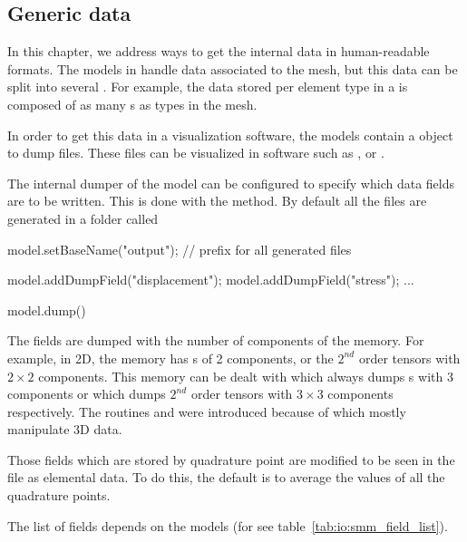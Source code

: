 \subsection{Generic data}
In this chapter, we address ways to get the internal data in human-readable formats.
The models in \akantu handle data associated to the
mesh, but this data can be split into several . For example, the
data stored per element type in a  is composed of as
many s as types in the mesh.

In order to get this data in a visualization software, the models contain a
object to dump  files. These files can be visualized in software such
as \cite{paraview}, \cite{visit} or \cite{mayavi}.

The internal dumper of the model can be configured to specify which data fields
are to be written. This is done with the
 method. By default all the files
are generated in a folder called 

\begin{cpp}
  model.setBaseName("output"); // prefix for all generated files

  model.addDumpField("displacement");
  model.addDumpField("stress");
  ...

  model.dump()
\end{cpp}

The fields are dumped with the number of components of the memory. For example, in 2D, the memory has 
s of 2 components, or the $2^{nd}$ order tensors with $2\times2$ components.  
This memory can be dealt with  which always dumps
s with 3 components or  which dumps $2^{nd}$
order tensors with $3\times3$ components respectively. The routines  and
 were introduced because of  which mostly manipulate 3D data.

Those fields which are stored by quadrature point are modified to be seen in the
 file as elemental data. To do this, the default is to average the
values of all the quadrature points.

The list of fields depends on the models (for
 see table~\ref{tab:io:smm_field_list}).

